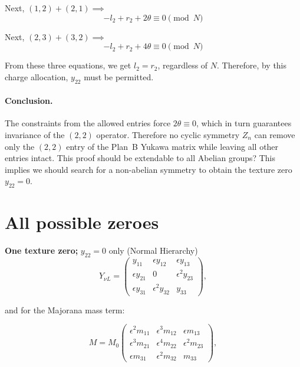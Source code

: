 Next, $(1,2) + (2,1) \implies$
\begin{equation}
    -l_2 + r_2 + 2 \theta \equiv 0 \pmod N
\end{equation}

Next, $(2,3) + (3,2) \implies$
\begin{equation}
    -l_2 + r_2 + 4 \theta \equiv 0 \pmod N
\end{equation}

From these three equations, we get $l_2 = r_2$, regardless of $N$. Therefore, by this charge allocation, $y_{22}$ must be permitted.

\paragraph{Conclusion.}
    The constraints from the allowed entries force $2 \theta \equiv 0$, which in turn guarantees invariance of the $(2,2)$ operator. Therefore no cyclic symmetry $Z_n$ can remove only the $(2,2)$ entry of the Plan~B Yukawa matrix while leaving all other entries intact. This proof should be extendable to all Abelian groups? This implies we should search for a non-abelian symmetry to obtain the texture zero $y_{22} = 0$.

\section{All possible zeroes}


\textbf{One texture zero;} $y_{22} = 0$ only (Normal Hierarchy)
\begin{equation} \label{General Yukawa Neutrino}
    Y_{\nu L} = 
    \begin{pmatrix}
        y_{11} &\epsilon y_{12} & \epsilon y_{13} \\
        \epsilon y_{21}&0&\epsilon^{2}y_{23}\\
        \epsilon y_{31}& \epsilon^{2}y_{32}&y_{33}
    \end{pmatrix},
\end{equation}

and for the Majorana mass term:

\begin{equation} \label{General Majorana Mass}
    M = M_0
    \begin{pmatrix}
    \epsilon^{2}m_{11}&\epsilon^{3}m_{12}&\epsilon m_{13}\\
    
    \epsilon^{3} m_{21} & \epsilon^{4} m_{22}& \epsilon^{2} m_{23}\\
    
    \epsilon m_{31} & \epsilon^{2}m_{32}&m_{33} 
    \end{pmatrix},
\end{equation}

